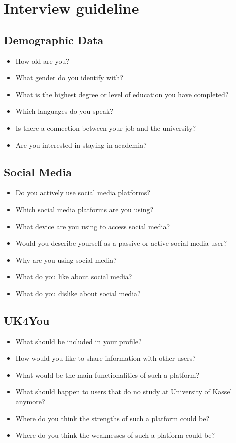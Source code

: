 \section{Interview guideline}


\subsection{Demographic Data}
\begin{itemize}
    \item How old are you?
    \item What gender do you identify with?
    \item What is the highest degree or level of education you have completed?
    \item Which languages do you speak?
    \item Is there a connection between your job and the university?
    \item Are you interested in staying in academia?
\end{itemize}

\subsection{Social Media}
\begin{itemize}
    \item Do you actively use social media platforms?
    \item Which social media platforms are you using?
    \item What device are you using to access social media?
    \item Would you describe yourself as a passive or active social media user?
    \item Why are you using social media?
    \item What do you like about social media?
    \item What do you dislike about social media?
\end{itemize}

\subsection{UK4You}
\begin{itemize}
    \item What should be included in your profile?
    \item How would you like to share information with other users?
    \item What would be the main functionalities of such a platform?
    \item What should happen to users that do no study at University of Kassel anymore?
    \item Where do you think the strengths of such a platform could be?
    \item Where do you think the weaknesses of such a platform could be?
\end{itemize}
